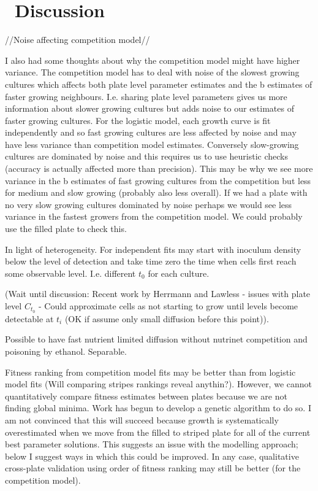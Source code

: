 \graphicspath{{images/}}

\section{\thesection~Discussion}
\label{sec:discussion}

//Noise affecting competition model//

I also had some thoughts about why the competition model might have
higher variance. The competition model has to deal with noise of the
slowest growing cultures which affects both plate level parameter
estimates and the b estimates of faster growing
neighbours. I.e. sharing plate level parameters gives us more
information about slower growing cultures but adds noise to our
estimates of faster growing cultures. For the logistic model, each
growth curve is fit independently and so fast growing cultures are
less affected by noise and may have less variance than competition
model estimates. Conversely slow-growing cultures are dominated by
noise and this requires us to use heuristic checks (accuracy is
actually affected more than precision). This may be why we see more
variance in the b estimates of fast growing cultures from the
competition but less for medium and slow growing (probably also less
overall). If we had a plate with no very slow growing cultures
dominated by noise perhaps we would see less variance in the fastest
growers from the competition model. We could probably use the filled
plate to check this.


In light of heterogeneity. For independent fits may start with
inoculum density below the level of detection and take time zero the
time when cells first reach some observable level. I.e. different
\(t_{0}\) for each culture.


(Wait until discussion: Recent work by Herrmann and Lawless - issues
with plate level \(C_{t_{0}}\) - Could approximate cells as not
starting to grow until levels become detectable at \(t_{i}\) (OK if
assume only small diffusion before this point)).



Possible to have fast nutrient limited diffusion without nutrinet
competition and poisoning by ethanol. Separable.


Fitness ranking from competition model fits may be better than from
logistic model fits (Will comparing stripes rankings reveal
anythin?). However, we cannot quantitatively compare fitness estimates
between plates because we are not finding global minima. Work has
begun to develop a genetic algorithm to do so. I am not convinced that
this will succeed because growth is systematically overestimated when
we move from the filled to striped plate for all of the current best
parameter solutions. This suggests an issue with the modelling
approach; below I suggest ways in which this could be improved. In
any case, qualitative cross-plate validation using order of fitness
ranking may still be better (for the competition model).

